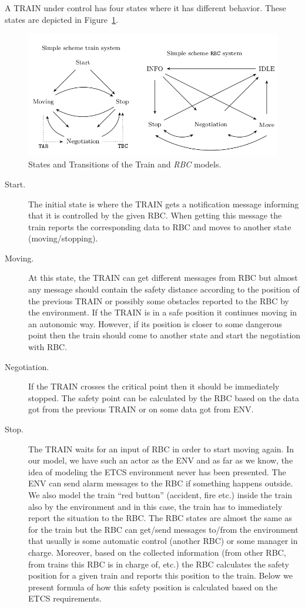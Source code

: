 \documentclass{template/openetcs_article}
\begin{document}
A TRAIN under control has four states where it has different behavior. These states are depicted in Figure~\ref{fig:states}. 

\begin{figure}[!htbp]
\centering
  \includegraphics[width=.8\textwidth]{figures/ETCSStates.png}
  \caption{States and Transitions of the Train and \textit{RBC} models.}
  \label{fig:states}
\end{figure}

\begin{description}

\item[Start.] The initial state is where the TRAIN gets a notification message informing that it is controlled by the given RBC. When getting this message the train reports the corresponding data to RBC and moves to another state (moving/stopping).

\item[Moving.] At this state, the TRAIN can get different messages from RBC but almost any message should contain the safety distance according to the position of the previous TRAIN or possibly some obstacles reported to the RBC by the environment. If the TRAIN is in a safe position it continues moving in an autonomic way. However, if its position is closer to some dangerous point then the train should come to another state and start the negotiation with RBC.

\item[Negotiation.] If the TRAIN crosses the critical point then it should be immediately stopped. The safety point can be calculated by the RBC based on the data got from the previous TRAIN or on some data got from ENV.

\item[Stop.] The TRAIN waits for an input of RBC in order to start moving again. In our model, we have such an actor as the ENV and as far as we know, the idea of modeling the ETCS environment never has been presented. The ENV can send alarm messages to the RBC if something happens outside. We also model the train “red button” (accident, fire etc.) inside the train also by the environment and in this case, the train has to immediately report the situation to the RBC. The RBC states are almost the same as for the train but the RBC can get/send messages to/from the environment that usually is some automatic control (another RBC) or some manager in charge. Moreover, based on the collected information (from other RBC, from trains this RBC is in charge of, etc.) the RBC calculates the safety position for a given train and reports this position to the train. Below we present formula of how this safety position is calculated based on the ETCS requirements.
\end{description}
\end{document}

